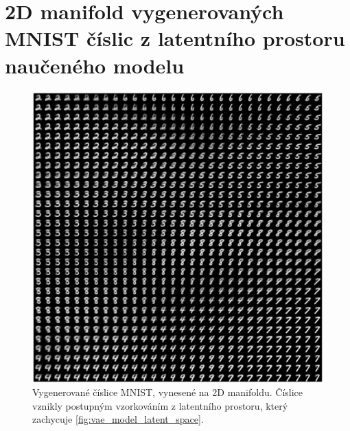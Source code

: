 \chapter{2D manifold vygenerovaných MNIST číslic z latentního prostoru naučeného modelu}
\label{app:reconstruction_manfiold}

\begin{figure}[H]
    \centering
    \includegraphics[width=\textwidth]{figures/2d_manifold.png}
    \caption{Vygenerované číslice MNIST, vynesené na 2D manifoldu. Číslice vznikly postupným vzorkováním z latentního prostoru, který zachycuje \autoref{fig:vae_model_latent_space}.  }
\end{figure}